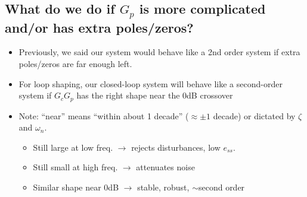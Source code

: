 \documentclass{book}
\begin{document}
\subsection*{What do we do if $ G_p $ is more complicated and/or has extra poles/zeros?}
\begin{itemize}
	\item Previously, we said our system would behave like a 2nd order system if extra poles/zeros are far enough left. %
	\item For loop shaping, our closed-loop system will behave like a second-order system if $ G_cG_p $ has the right shape near the 0dB crossover
	\item Note: ``near'' means ``within about 1 decade'' ($ \approx \pm 1 $ decade) or dictated by $ \zeta $ and $ \omega_n $.
	\begin{center}
	\end{center}
	\begin{itemize}
		\item Still large at low freq. $ \rightarrow $ rejects disturbances, low $ e_{ss} $.
		\item Still small at high freq. $ \rightarrow $ attenuates noise
		\item Similar shape near 0dB $ \rightarrow $ stable, robust, $ \sim $second order
	\end{itemize}
\end{itemize}
\end{document}

